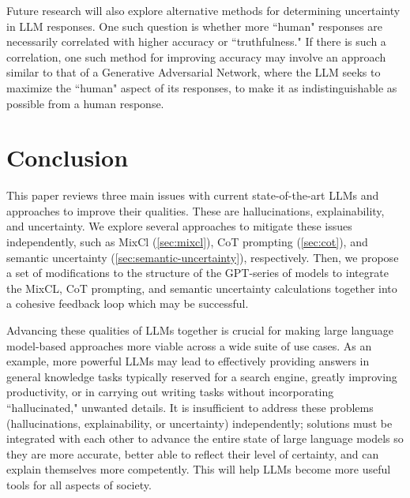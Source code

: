 \documentclass[letterpaper,12pt]{article}
\begin{document}
Future research will also explore alternative methods for determining uncertainty in LLM responses. One such question is whether more ``human" responses are necessarily correlated with higher accuracy or ``truthfulness." If there is such a correlation, one such method for improving accuracy may involve an approach similar to that of a Generative Adversarial Network, where the LLM seeks to maximize the ``human" aspect of its responses, to make it as indistinguishable as possible from a human response.

\section{Conclusion}
This paper reviews three main issues with current state-of-the-art LLMs and approaches to improve their qualities. These are hallucinations, explainability, and uncertainty. We explore several approaches to mitigate these issues independently, such as MixCl (\cref{sec:mixcl}), CoT prompting (\cref{sec:cot}), and semantic uncertainty (\cref{sec:semantic-uncertainty}), respectively. Then, we propose a set of modifications to the structure of the GPT-series of models to integrate the MixCL, CoT prompting, and semantic uncertainty calculations together into a cohesive feedback loop which may be successful.

Advancing these qualities of LLMs together is crucial for making large language model-based approaches more viable across a wide suite of use cases. As an example, more powerful LLMs may lead to effectively providing answers in general knowledge tasks typically reserved for a search engine, greatly improving productivity, or in carrying out writing tasks without incorporating ``hallucinated," unwanted details. It is insufficient to address these problems (hallucinations, explainability, or uncertainty) independently; solutions must be integrated with each other to advance the entire state of large language models so they are more accurate, better able to reflect their level of certainty, and can explain themselves more competently. This will help LLMs become more useful tools for all aspects of society.

\printbibliography
\end{document}
